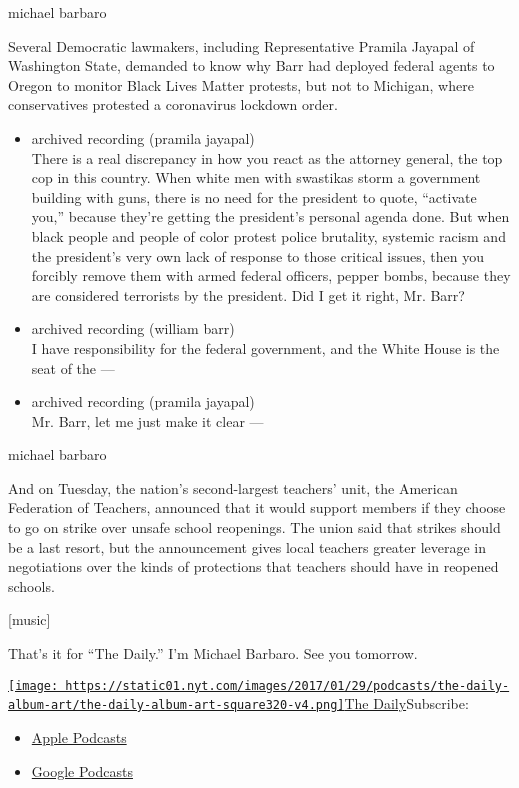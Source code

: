 michael barbaro

Several Democratic lawmakers, including Representative Pramila Jayapal
of Washington State, demanded to know why Barr had deployed federal
agents to Oregon to monitor Black Lives Matter protests, but not to
Michigan, where conservatives protested a coronavirus lockdown order.

\begin{itemize}
\item
  archived recording (pramila jayapal)\\
  There is a real discrepancy in how you react as the attorney general,
  the top cop in this country. When white men with swastikas storm a
  government building with guns, there is no need for the president to
  quote, ``activate you,'' because they're getting the president's
  personal agenda done. But when black people and people of color
  protest police brutality, systemic racism and the president's very own
  lack of response to those critical issues, then you forcibly remove
  them with armed federal officers, pepper bombs, because they are
  considered terrorists by the president. Did I get it right, Mr. Barr?
\item
  archived recording (william barr)\\
  I have responsibility for the federal government, and the White House
  is the seat of the ---
\item
  archived recording (pramila jayapal)\\
  Mr. Barr, let me just make it clear ---
\end{itemize}

michael barbaro

And on Tuesday, the nation's second-largest teachers' unit, the American
Federation of Teachers, announced that it would support members if they
choose to go on strike over unsafe school reopenings. The union said
that strikes should be a last resort, but the announcement gives local
teachers greater leverage in negotiations over the kinds of protections
that teachers should have in reopened schools.

{[}music{]}

That's it for ``The Daily.'' I'm Michael Barbaro. See you tomorrow.

\href{https://www.nytimes.com/column/the-daily}{\texttt{[image: https://static01.nyt.com/images/2017/01/29/podcasts/the-daily-album-art/the-daily-album-art-square320-v4.png]}The
Daily}Subscribe:

\begin{itemize}
\tightlist
\item
  \href{https://itunes.apple.com/us/podcast/id1200361736}{Apple
  Podcasts}
\item
  \href{https://www.google.com/podcasts?feed=aHR0cHM6Ly9yc3MuYXJ0MTkuY29tL3RoZS1kYWlseQ\%3D\%3D}{Google
  Podcasts}
\end{itemize}

